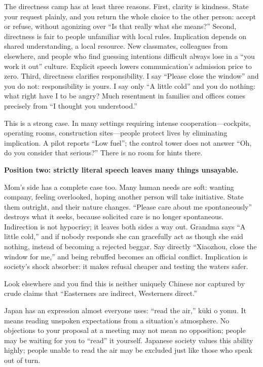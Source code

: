 The directness camp has at least three reasons. First, clarity is kindness. State your request plainly, and you return the whole choice to the other person: accept or refuse, without agonizing over ``Is that really what she means?'' Second, directness is fair to people unfamiliar with local rules. Implication depends on shared understanding, a local resource. New classmates, colleagues from elsewhere, and people who find guessing intentions difficult always lose in a ``you work it out'' culture. Explicit speech lowers communication's admission price to zero. Third, directness clarifies responsibility. I say ``Please close the window'' and you do not: responsibility is yours. I say only ``A little cold'' and you do nothing: what right have I to be angry? Much resentment in families and offices comes precisely from ``I thought you understood.''

This is a strong case. In many settings requiring intense cooperation---cockpits, operating rooms, construction sites---people protect lives by eliminating implication. A pilot reports ``Low fuel''; the control tower does not answer ``Oh, do you consider that serious?'' There is no room for hints there.

\textbf{Position two: strictly literal speech leaves many things unsayable.}

Mom's side has a complete case too. Many human needs are soft: wanting company, feeling overlooked, hoping another person will take initiative. State them outright, and their nature changes. ``Please care about me spontaneously'' destroys what it seeks, because solicited care is no longer spontaneous. Indirection is not hypocrisy; it leaves both sides a way out. Grandma says ``A little cold,'' and if nobody responds she can gracefully act as though she said nothing, instead of becoming a rejected beggar. Say directly ``Xiaozhou, close the window for me,'' and being rebuffed becomes an official conflict. Implication is society's shock absorber: it makes refusal cheaper and testing the waters safer.

Look elsewhere and you find this is neither uniquely Chinese nor captured by crude claims that ``Easterners are indirect, Westerners direct.''

Japan has an expression almost everyone uses: ``read the air,'' kūki o yomu. It means reading unspoken expectations from a situation's atmosphere. No objections to your proposal at a meeting may not mean no opposition; people may be waiting for you to ``read'' it yourself. Japanese society values this ability highly; people unable to read the air may be excluded just like those who speak out of turn.

